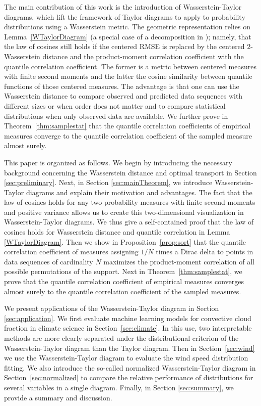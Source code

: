 \documentclass{amsart}
\numberwithin{equation}{section}
\theoremstyle{plain}
\theoremstyle{definition}
\begin{document}
The main contribution of this work is the introduction of Wasserstein-Taylor diagrams, which lift the framework of Taylor diagrams to apply to probability distributions using a Wasserstein metric.
The geometric representation relies on Lemma~\ref{WTaylorDiagram} (a special case of a decomposition in \cite{irpino2007optimal}); namely, that the law of cosines still holds if the centered RMSE is replaced by the centered $2$-Wasserstein distance and the product-moment correlation coefficient with the quantile correlation coefficient. 
The former is a metric between centered measures with finite second moments and the latter the cosine similarity between quantile functions of those centered measures.
The advantage is that one can use the Wasserstein distance to compare observed and predicted data sequences with different sizes or when order does not matter and to compare statistical distributions when only observed data are available. 
We further prove in Theorem~\ref{thm:samplestat} that the quantile correlation coefficients of empirical measures converge to the quantile correlation coefficient of the sampled measure almost surely.
 

This paper is organized as follows. 
We begin by introducing the necessary background concerning the Wasserstein distance and optimal transport in Section \ref{sec:preliminary}. 
Next, in Section \ref{sec:mainTheorem}, we introduce Wasserstein-Taylor diagrams and explain their motivation and advantages.
The fact that the law of cosines holds for any two probability measures with finite second moments and positive variance allows us to create this two-dimensional visualization in Wasserstein-Taylor diagrams.
We thus give a self-contained proof that the law of cosines holds for Wasserstein distance and quantile correlation in Lemma \ref{WTaylorDiagram}. 
Then we show in Proposition~\ref{prop:sort} that the quantile correlation coefficient of measures assigning $1/N$ times a Dirac delta to points in data sequences of cardinality $N$ maximizes the product-moment correlation of all possible permutations of the support.
Next in Theorem~\ref{thm:samplestat}, we prove that the quantile correlation coefficient of empirical measures converges almost surely to the quantile correlation coefficient of the sampled measures.

We present applications of the Wasserstein-Taylor diagram in Section \ref{sec:application}. 
We first evaluate machine learning models for convective cloud fraction in climate science in Section~\ref{sec:climate}. 
In this use, two interpretable methods are more clearly separated under the distributional criterion of the Wasserstein-Taylor diagram than the Taylor diagram.
Then in Section~\ref{sec:wind} we use the Wasserstein-Taylor diagram to evaluate the wind speed distribution fitting. 
We also introduce the so-called normalized Wasserstein-Taylor diagram in Section~\ref{sec:normalized} to compare the relative performance of distributions for several variables in a single diagram. 
Finally, in Section \ref{sec:summary}, we provide a summary and discussion. 
\end{document}

